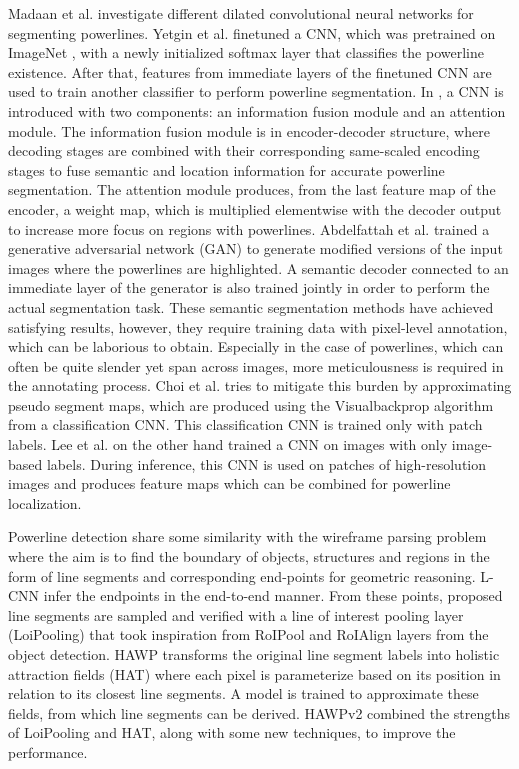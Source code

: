 \documentclass[journal]{IEEEtran}
\begin{document}
Madaan et al. \cite{related_work_rainesh_mandaan_2017} investigate different dilated convolutional neural networks for segmenting powerlines. Yetgin et al. \cite{related_work_omer_emre_yetgin_2018} finetuned a CNN, which was pretrained on ImageNet \cite{deng2009imagenet}, with a newly initialized softmax layer that classifies the powerline existence. After that, features from immediate layers of the finetuned CNN are used to train another classifier to perform powerline segmentation. In \cite{related_work_yan_li_2019}, a CNN is introduced with two components: an information fusion module and an attention module. The information fusion module is in encoder-decoder structure, where decoding stages are combined with their corresponding same-scaled encoding stages to fuse semantic and location information for accurate powerline segmentation. The attention module produces, from the last feature map of the encoder, a weight map, which is multiplied elementwise with the decoder output to increase more focus on regions with powerlines. Abdelfattah et al. \cite{related_work_rabab_abdelfattah_2022} trained a generative adversarial network (GAN) to generate modified versions of the input images where the powerlines are highlighted. A semantic decoder connected to an immediate layer of the generator is also trained jointly in order to perform the actual segmentation task. These semantic segmentation methods have achieved satisfying results, however, they require training data with pixel-level annotation, which can be laborious to obtain. Especially in the case of powerlines, which can often be quite slender yet span across images, more meticulousness is required in the annotating process. Choi et al. \cite{related_work_hyeyeon_choi_2021} tries to mitigate this burden by approximating pseudo segment maps, which are produced using the Visualbackprop algorithm \cite{vbp} from a classification CNN. This classification CNN is trained only with patch labels. Lee et al. \cite{related_work_sang_jun_lee_2017} on the other hand trained a CNN on images with only image-based labels. During inference, this CNN is used on patches of high-resolution images and produces feature maps which can be combined for powerline localization. 

Powerline detection share some similarity with the wireframe parsing problem where the aim is to find the boundary of objects, structures and regions in the form of line segments and corresponding end-points for geometric reasoning. L-CNN \cite{lcnn} infer the endpoints in the end-to-end manner. From these points, proposed line segments are sampled and verified with a line of interest pooling layer (LoiPooling) that took inspiration from RoIPool \cite{fastrcnn} and RoIAlign \cite{maskrcnn} layers from the object detection. HAWP \cite{hawp} transforms the original line segment labels into holistic attraction fields (HAT) where each pixel is parameterize based on its position in relation to its closest line segments. A model is trained to approximate these fields, from which line segments can be derived. HAWPv2 \cite{hawpv2} combined the strengths of LoiPooling and HAT, along with some new techniques, to improve the performance. 
\end{document}
